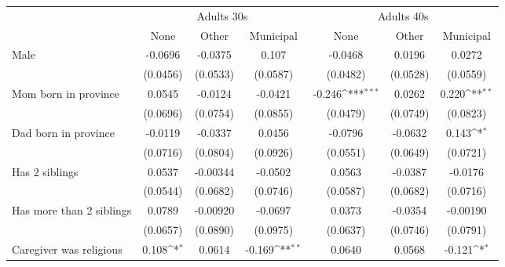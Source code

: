 {
\def\sym#1{\ifmmode^{#1}\else\(^{#1}\)\fi}
\begin{tabular}{l*{6}{c}}
\toprule
& \multicolumn{3}{c}{Adults 30s} &  \multicolumn{3}{c}{Adults 40s} \\
                    &\multicolumn{1}{c}{None}&\multicolumn{1}{c}{Other}&\multicolumn{1}{c}{Municipal}&\multicolumn{1}{c}{None}&\multicolumn{1}{c}{Other}&\multicolumn{1}{c}{Municipal}\\
\midrule
Male                &     -0.0696         &     -0.0375         &       0.107         &     -0.0468         &      0.0196         &      0.0272         \\
                    &    (0.0456)         &    (0.0533)         &    (0.0587)         &    (0.0482)         &    (0.0528)         &    (0.0559)         \\
\addlinespace
Mom born in province&      0.0545         &     -0.0124         &     -0.0421         &      -0.246\sym{***}&      0.0262         &       0.220\sym{**} \\
                    &    (0.0696)         &    (0.0754)         &    (0.0855)         &    (0.0479)         &    (0.0749)         &    (0.0823)         \\
\addlinespace
Dad born in province&     -0.0119         &     -0.0337         &      0.0456         &     -0.0796         &     -0.0632         &       0.143\sym{*}  \\
                    &    (0.0716)         &    (0.0804)         &    (0.0926)         &    (0.0551)         &    (0.0649)         &    (0.0721)         \\
\addlinespace
Has 2 siblings      &      0.0537         &    -0.00344         &     -0.0502         &      0.0563         &     -0.0387         &     -0.0176         \\
                    &    (0.0544)         &    (0.0682)         &    (0.0746)         &    (0.0587)         &    (0.0682)         &    (0.0716)         \\
\addlinespace
Has more than 2 siblings&      0.0789         &    -0.00920         &     -0.0697         &      0.0373         &     -0.0354         &    -0.00190         \\
                    &    (0.0657)         &    (0.0890)         &    (0.0975)         &    (0.0637)         &    (0.0746)         &    (0.0791)         \\
\addlinespace
Caregiver was religious&       0.108\sym{*}  &      0.0614         &      -0.169\sym{**} &      0.0640         &      0.0568         &      -0.121\sym{*}  \\

\end{tabular}}
